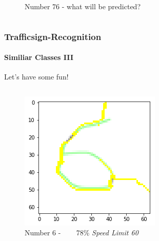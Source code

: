 \begin{frame}
\begin{columns}
\begin{column}{0.33\textwidth}
\begin{center}
\begin{figure}
				\caption[76]{Number 76 - what will be predicted?}
				\label{fig:76}
			\end{figure}
		\end{center}
	\end{column}
\end{columns}
\end{frame}

\begin{frame}
\frametitle{Trafficsign-Recognition}
\framesubtitle{Similiar Classes III}
\begin{center}	
	Let's have some fun!
\end{center}
\begin{columns}
	\begin{column}{0.33\textwidth}
		\begin{center}
			\begin{figure}
				\includegraphics[width=0.9\linewidth]{Images/6Prediction}
				\caption[6]{Number  6  - ~~~ 78\% \textit{Speed Limit 60}}
				\label{fig:6Pred}
			\end{figure}
		\end{center}		
	\end{column}
	\begin{column}{0.33\textwidth}
		\begin{center}
			\begin{figure}

\end{figure}
\end{center}
\end{column}
\end{columns}
\end{frame}
